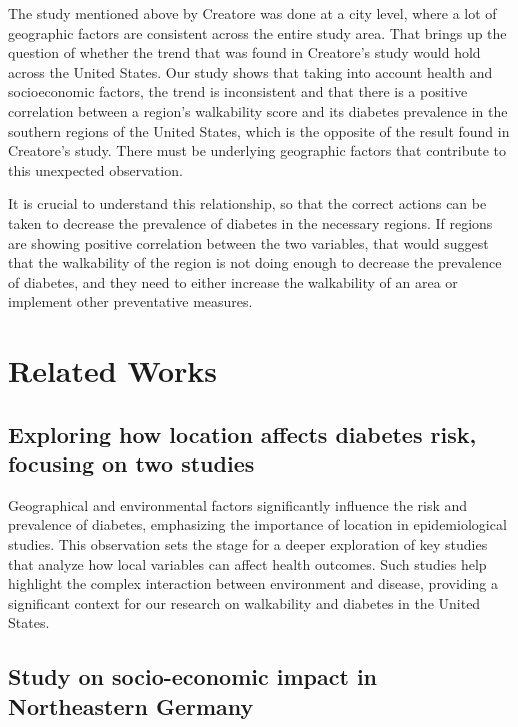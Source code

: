 \documentclass[
]{article}
\begin{document}
The study mentioned above by Creatore was done at a city level, where a
lot of geographic factors are consistent across the entire study area.
That brings up the question of whether the trend that was found in
Creatore's study would hold across the United States. Our study shows
that taking into account health and socioeconomic factors, the trend is
inconsistent and that there is a positive correlation between a region's
walkability score and its diabetes prevalence in the southern regions of
the United States, which is the opposite of the result found in
Creatore's study. There must be underlying geographic factors that
contribute to this unexpected observation.

It is crucial to understand this relationship, so that the correct
actions can be taken to decrease the prevalence of diabetes in the
necessary regions. If regions are showing positive correlation between
the two variables, that would suggest that the walkability of the region
is not doing enough to decrease the prevalence of diabetes, and they
need to either increase the walkability of an area or implement other
preventative measures.

\section{Related Works}\label{related-works}

\subsection{Exploring how location affects diabetes risk, focusing on
two
studies}\label{exploring-how-location-affects-diabetes-risk-focusing-on-two-studies}

Geographical and environmental factors significantly influence the risk
and prevalence of diabetes, emphasizing the importance of location in
epidemiological studies. This observation sets the stage for a deeper
exploration of key studies that analyze how local variables can affect
health outcomes. Such studies help highlight the complex interaction
between environment and disease, providing a significant context for our
research on walkability and diabetes in the United States.

\subsection{Study on socio-economic impact in Northeastern
Germany}\label{study-on-socio-economic-impact-in-northeastern-germany}
\end{document}
